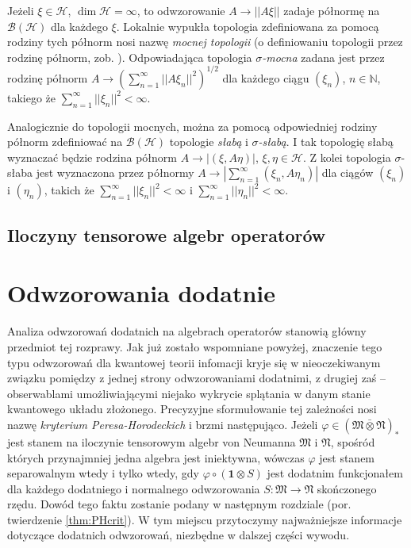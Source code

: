 Jeżeli $\xi \in \mathcal{H}$,
$\dim \mathcal{H} \!=\! \infty$, to odwzorowanie $A \rightarrow
||A\xi||$ zadaje
półnormę na $\mathcal{B}(\mathcal{H})$ dla każdego $\xi$.
Lokalnie wypukła topologia zdefiniowana za
pomocą rodziny tych półnorm nosi nazwę \emph{mocnej topologii}
(o definiowaniu
topologii przez rodzinę półnorm, zob. \cite{Rudin1991}).
Odpowiadająca topologia \emph{$\sigma$-mocna} zadana jest przez
rodzinę półnorm
$A \rightarrow \left( \sum \limits_{n=1}^{\infty} ||A \xi_{n}||^{2} \right)^{1/2}$
dla każdego ciągu $(\xi_{n})$,
$n \in \mathbb{N}$, takiego że
$\sum \limits_{n=1}^{\infty} ||\xi_{n}||^{2} < \infty$.

Analogicznie do topologii mocnych, można za pomocą odpowiedniej rodziny
półnorm
zdefiniować na $\mathcal{B}(\mathcal{H})$ topologie \emph{słabą} i \emph{$\sigma$-słabą}.
I tak topologię słabą
wyznaczać będzie rodzina półnorm $A \rightarrow |(\xi, A \eta)|$,
$\xi, \eta
\in \mathcal{H}$. Z kolei topologia $\sigma$-słaba jest wyznaczona
przez półnormy
$A \rightarrow \left| \sum \limits_{n=1}^{\infty} (\xi_{n}, A
\eta_{n})
\right|$ dla ciągów $(\xi_{n})$ i $(\eta_{n})$, takich że
$\sum \limits_{n=1}^{\infty} ||\xi_{n}||^{2} < \infty$ i
$\sum \limits_{n=1}^{\infty} ||\eta_{n}||^{2} < \infty$.

\subsection{Iloczyny tensorowe algebr operatorów}




\section{Odwzorowania dodatnie}
Analiza odwzorowań dodatnich na algebrach operatorów stanowią główny przedmiot
tej rozprawy.
Jak już zostało wspomniane powyżej, znaczenie tego typu odwzorowań dla kwantowej
teorii infomacji kryje się w nieoczekiwanym związku pomiędzy z jednej strony
odwzorowaniami dodatnimi,
z drugiej zaś -- obserwablami umożliwiającymi niejako wykrycie splątania w
danym stanie kwantowego układu złożonego.
Precyzyjne sformułowanie tej zależności nosi nazwę \emph{kryterium Peresa-Horodeckich}
i brzmi następująco.
Jeżeli $\varphi \in (\mathfrak{M} \bar{\otimes} \mathfrak{N})_{*}$ jest stanem
na iloczynie tensorowym algebr von Neumanna
$\mathfrak{M}$ i $\mathfrak{N}$,
spośród których przynajmniej jedna algebra jest iniektywna,
wówczas $\varphi$ jest stanem separowalnym wtedy i tylko wtedy,
gdy $\varphi \circ (\mathbf{1} \otimes S)$ jest dodatnim funkcjonałem
dla każdego dodatniego i normalnego odwzorowania
$S: \mathfrak{M} \rightarrow \mathfrak{N}$
skończonego rzędu.
Dowód tego faktu zostanie podany w następnym rozdziale
(por. twierdzenie \ref{thm:PHcrit}).
W tym miejscu przytoczymy najważniejsze informacje dotyczące dodatnich
odwzorowań, niezbędne w dalszej części wywodu.

